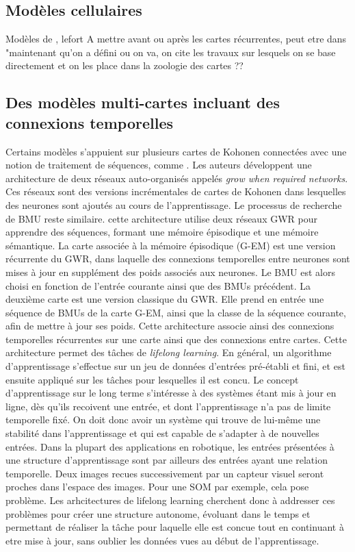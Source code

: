 \documentclass[../main]{subfiles}
\begin{document}
\subsection{Modèles cellulaires}
Modèles de \cite{khouzam,menard05}, lefort
A mettre avant ou après les cartes récurrentes, peut etre dans "maintenant qu'on a défini ou on va, on cite les travaux sur lesquels on se base directement et on les place dans la zoologie des cartes ??

\subsection{Des modèles multi-cartes incluant des connexions temporelles}

Certains modèles s'appuient sur plusieurs cartes de Kohonen connectées avec une notion de traitement de séquences, comme \cite{parisiLL}. Les auteurs développent une architecture de deux réseaux auto-organisés appelés \emph{grow when required networks}. Ces réseaux sont des versions incrémentales de cartes de Kohonen dans lesquelles des neurones sont ajoutés au cours de l'apprentissage. Le processus de recherche de BMU reste similaire.
cette architecture utilise deux réseaux GWR pour apprendre des séquences, formant une mémoire épisodique et une mémoire sémantique.
La carte associée à la mémoire épisodique (G-EM) est une version récurrente du GWR, dans laquelle des connexions temporelles entre neurones sont mises à jour en supplément des poids associés aux neurones. Le BMU est alors choisi en fonction de l'entrée courante ainsi que des BMUs précédent. 
La deuxième carte est une version classique du GWR. Elle prend en entrée une séquence de BMUs de la carte G-EM, ainsi que la classe de la séquence courante, afin de mettre à jour ses poids. 
Cette architecture associe ainsi des connexions temporelles récurrentes sur une carte ainsi que des connexions entre cartes.
Cette architecture permet des tâches de \emph{lifelong learning}. En général, un algorithme d'apprentissage s'effectue sur un jeu de données d'entrées pré-établi et fini, et est ensuite appliqué sur les tâches pour lesquelles il est concu.
Le concept d'apprentissage sur le long terme s'intéresse à des systèmes étant mis à jour en ligne, dès qu'ils recoivent une entrée, et dont l'apprentissage n'a pas de limite temporelle fixé. On doit donc avoir un système qui trouve de lui-même une stabilité dans l'apprentissage et qui est capable de s'adapter à de nouvelles entrées.
Dans la plupart des applications en robotique, les entrées présentées à une structure d'apprentissage sont par ailleurs des entrées ayant une relation temporelle. Deux images recues successivement par un capteur visuel seront proches dans l'espace des images. Pour une SOM par exemple, cela pose problème. Les arhcitectures de lifelong learning cherchent donc à addresser ces problèmes pour créer une structure autonome, évoluant dans le temps et permettant de réaliser la tâche pour laquelle elle est concue tout en continuant à etre mise à jour, sans oublier les données vues au début de l'apprentissage.
\end{document}
